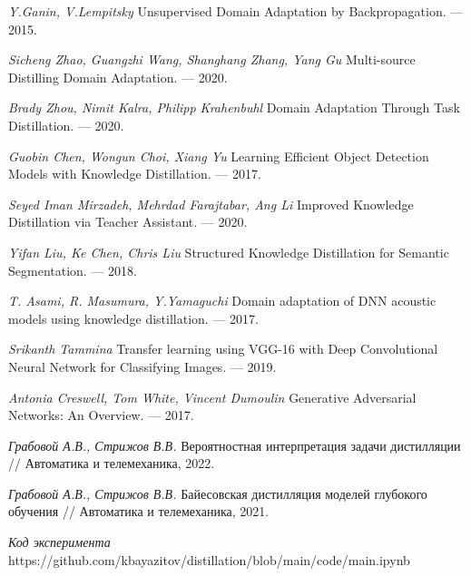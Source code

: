 \begin{thebibliography}{99}
    \textit{Y.Ganin, V.Lempitsky} Unsupervised Domain Adaptation by Backpropagation. --- 2015.
    
    \textit{Sicheng Zhao, Guangzhi Wang, Shanghang Zhang, Yang Gu} Multi-source Distilling Domain Adaptation. --- 2020.
    
    \textit{Brady Zhou, Nimit Kalra,  Philipp Krahenbuhl} Domain Adaptation Through Task Distillation. --- 2020.
    
    \textit{Guobin Chen, Wongun Choi, Xiang Yu} Learning Efficient Object Detection Models with Knowledge Distillation. --- 2017.
    
    \textit{Seyed Iman Mirzadeh, Mehrdad Farajtabar, Ang Li} Improved Knowledge Distillation via Teacher Assistant. --- 2020.
    
    \textit{Yifan Liu, Ke Chen, Chris Liu} Structured Knowledge Distillation for Semantic Segmentation. --- 2018.
    
    \textit{T. Asami, R. Masumura, Y.Yamaguchi} Domain adaptation of DNN acoustic models using knowledge distillation. --- 2017.
    
    \textit{Srikanth Tammina} Transfer learning using VGG-16 with Deep
    Convolutional Neural Network for Classifying Images. --- 2019.
    
    \textit{Antonia Creswell, Tom White, Vincent Dumoulin} Generative Adversarial Networks: An Overview. --- 2017.
    
    \textit{Грабовой А.В., Стрижов В.В.} Вероятностная интерпретация задачи дистилляции // Автоматика и телемеханика, 2022.
    
    \textit{Грабовой А.В., Стрижов В.В.} Байесовская дистилляция моделей глубокого обучения // Автоматика и телемеханика, 2021.
    
    \textit{Код эксперимента}\\ https://github.com/kbayazitov/distillation/blob/main/code/main.ipynb
	
\end{thebibliography}
